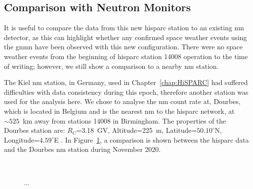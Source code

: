 \subsection{Comparison with Neutron Monitors}\label{sec:HS_14008_vs_Kiel}

It is useful to compare the data from this new \gls{hisparc} station to an existing \gls{nm} detector, as this can highlight whether any confirmed space weather events using the \gls{gnmn} have been observed with this new configuration. There were no space weather events from the beginning of \gls{hisparc} station 14008 operation to the time of writing; however, we still show a comparison to a nearby \gls{nm} station.

The Kiel \gls{nm} station, in Germany, used in Chapter~\ref{chap:HiSPARC} had suffered difficulties with data consistency during this epoch, therefore another station was used for the analysis here. We chose to analyse the \gls{nm} count rate at, Dourbes, which is located in Belgium and is the nearest \gls{nm} to the \gls{hisparc} network, at $\sim 525$~km away from stations 14008 in Birmingham. The properties of the Dourbes station are: $R_C$=3.18~GV, Altitude=225~m, Latitude=$50.10^{\circ}$N, Longitude=$4.59^{\circ}$E \citep{nmdb_nmdb_nodate}. In Figure~\ref{fig:14008_vs_DRBS}, a comparison is shown between the \gls{hisparc} data and the Dourbes \gls{nm} station during November 2020.

\begin{figure}[ht!]
	\centering
	 \\

	
	\caption{...}
	\label{fig:14008_vs_DRBS}
\end{figure}


